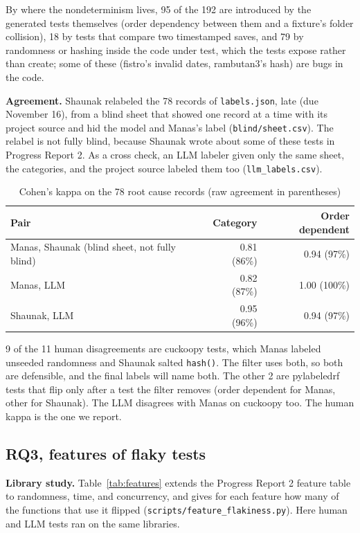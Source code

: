 By where the nondeterminism lives, 95 of the 192 are introduced by the generated tests themselves (order dependency between them and a fixture's folder collision), 18 by tests that compare two timestamped saves, and 79 by randomness or hashing inside the code under test, which the tests expose rather than create; some of these (fistro's invalid dates, rambutan3's hash) are bugs in the code.

\textbf{Agreement.} Shaunak relabeled the 78 records of \texttt{labels.json}, late (due November 16), from a blind sheet that showed one record at a time with its project source and hid the model and Manas's label (\texttt{blind/sheet.csv}). The relabel is not fully blind, because Shaunak wrote about some of these tests in Progress Report 2. As a cross check, an LLM labeler given only the same sheet, the categories, and the project source labeled them too (\texttt{llm\_labels.csv}).

\begin{table}[htbp]
\caption{Cohen's kappa on the 78 root cause records (raw agreement in parentheses)}
\label{tab:kappa}
\small
\begin{tabular}{lrr}
\toprule
Pair & Category & Order dependent \\
\midrule
Manas, Shaunak (blind sheet, not fully blind) & 0.81 (86\%) & 0.94 (97\%) \\
Manas, LLM & 0.82 (87\%) & 1.00 (100\%) \\
Shaunak, LLM & 0.95 (96\%) & 0.94 (97\%) \\
\bottomrule
\end{tabular}
\end{table}

9 of the 11 human disagreements are cuckoopy tests, which Manas labeled unseeded randomness and Shaunak salted \texttt{hash()}. The filter uses both, so both are defensible, and the final labels will name both. The other 2 are pylabeledrf tests that flip only after a test the filter removes (order dependent for Manas, other for Shaunak). The LLM disagrees with Manas on cuckoopy too. The human kappa is the one we report.

\subsection{RQ3, features of flaky tests}
\label{sec:rq3}
\textbf{Library study.} Table~\ref{tab:features} extends the Progress Report 2 feature table to randomness, time, and concurrency, and gives for each feature how many of the functions that use it flipped (\texttt{scripts/feature\_flakiness.py}). Here human and LLM tests ran on the same libraries.

